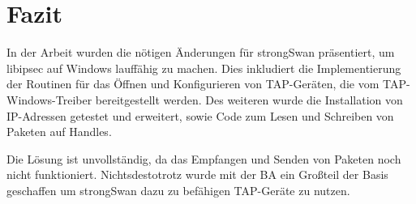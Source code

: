 



\section{Fazit}

In der Arbeit wurden die nötigen Änderungen für strongSwan präsentiert, um
libipsec auf Windows lauffähig zu machen. Dies inkludiert die Implementierung
der Routinen für das Öffnen und Konfigurieren von TAP-Geräten, die vom TAP-Windows-Treiber
bereitgestellt werden. Des weiteren wurde die Installation von IP-Adressen getestet
und erweitert, sowie Code zum Lesen und Schreiben von Paketen auf Handles.

Die Lösung ist unvollständig, da das Empfangen und Senden von Paketen noch nicht funktioniert.
Nichtsdestotrotz wurde mit der \ac{BA} ein Großteil der Basis geschaffen um strongSwan
dazu zu befähigen TAP-Geräte zu nutzen.

